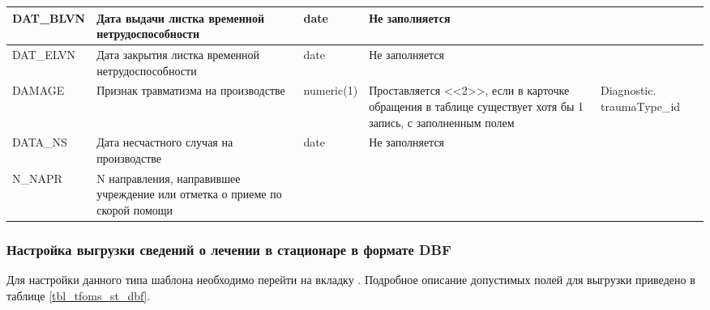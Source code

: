 {\begin{longtable}{|p{2.2cm}|p{2.6cm}|p{2.1cm}|p{5.1cm}|p{4cm}|}
DAT\_BLVN	& Дата выдачи листка временной нетрудоспособности & date &	Не заполняется &   \\ \hline	
DAT\_ELVN	& Дата закрытия листка временной нетрудоспособности	& date	& Не заполняется &  \\ \hline	
DAMAGE	& Признак травматизма на производстве	& numeric(1)	& Проставляется <<2>>, если в карточке обращения  в таблице \dm{Диагнозы} существует хотя бы 1 запись, с заполненным полем \dm{Травма} &	Diagnostic. traumaType\_id   \\ \hline
DATA\_NS	& Дата несчастного случая на   производстве & 	date	& Не заполняется  &  \\ \hline	
N\_NAPR	& N направления, направившее учреждение или отметка о приеме по скорой помощи &  & &   \\ \hline 			
\end{longtable}
}

\subsubsection{Настройка выгрузки сведений о лечении в стационаре в формате DBF}

Для настройки данного типа шаблона необходимо перейти на вкладку . Подробное описание допустимых полей для выгрузки приведено в таблице \ref{tbl_tfoms_st_dbf}.

